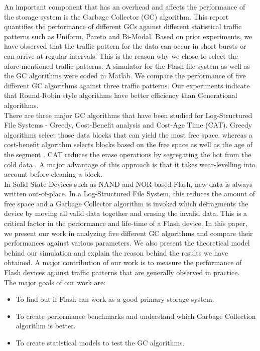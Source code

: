An important component that has an overhead and affects the performance of the storage system is the Garbage Collector (GC) algorithm. This report quantifies the performance of different GCs against different statistical traffic patterns such as Uniform, Pareto and Bi-Modal. Based on prior experiments, we have observed that the traffic pattern for the data can occur in short bursts or can arrive at regular intervals. This is the reason why we chose to select the afore-mentioned traffic patterns. A simulator for the Flash file system as well as the GC algorithms were coded in Matlab. We compare the performance of five different GC algorithms against three traffic patterns. Our experiments indicate that Round-Robin style algorithms have better efficiency than Generational algorithms.\\

There are three major GC algorithms that have been studied for Log-Structured File Systems - Greedy, Cost-Benefit analysis and Cost-Age Time (CAT). Greedy algorithms select those data blocks that can yield the most free space, whereas a cost-benefit algorithm selects blocks based on the free space as well as the age of the segment \cite{Menon98, Kwon07}. CAT reduces the erase operations by segregating the hot from the cold data \cite{Chiang99}. A major advantage of this approach is that it takes wear-levelling into account before cleaning a block. \\

In Solid State Devices such as NAND and NOR based Flash, new data is always written out-of-place. In a Log-Structured File System, this reduces the amount of free space and a Garbage Collector algorithm is invoked which defragments the device by moving all valid data together and erasing the invalid data. This is a critical factor in the performance and life-time of a Flash device. In this paper, we present our work in analyzing five different GC algorithms and compare their performances against various parameters. We also present the theoretical model behind our simulation and explain the reason behind the results we have obtained. A major contribution of our work is to measure the performance of Flash devices against traffic patterns that are generally observed in practice. \\
The major goals of our work are:
\begin{itemize}
\item To find out if Flash can work as a good primary storage system. 
\item To create performance benchmarks and understand which Garbage Collection algorithm is better. 
\item To create statistical models to test the GC algorithms.
\end{itemize}

